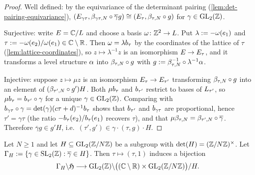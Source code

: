\begin{proof}
Well defined: by the equivariance of the determinant pairing
(\cref{lem:det-pairing-equivariance}),
$(E_{\gamma\tau}, \beta_{\gamma\tau,N}\circ\overline{\gamma} g)
\cong (E_{\tau}, \beta_{\tau,N}\circ g)$ for $\gamma \in \GL{2}{\ZZ}$.

Surjective: write $E = \mathbb{C}/L$ and choose a basis
$\omega \colon \mathbb{Z}^{2} \to L$. Put $\lambda := -\omega(e_{1})$
and $\tau := -\omega(e_{2})/\omega(e_{1}) \in \mathbb{C}\setminus\mathbb{R}$.
Then $\omega = \lambda b_{\tau}$ by the coordinates of the lattice
of $\tau$ (\cref{lem:lattice-coordinates}), so $z \mapsto \lambda^{-1}z$ is
an isomorphism $E \to E_{\tau}$, and it transforms a level structure
$\alpha$ into $\beta_{\tau,N}\circ g$ with
$g := \beta_{\tau,N}^{-1}\circ\lambda^{-1}\alpha$.

Injective: suppose $z \mapsto \mu z$ is an isomorphism
$E_{\tau} \to E_{\tau'}$ transforming
$\beta_{\tau,N} \circ g$ into an element of
$(\beta_{\tau',N}\circ g')H$. Both $\mu b_{\tau}$
and $b_{\tau'}$ restrict to bases of $L_{\tau'}$, so
$\mu b_{\tau} = b_{\tau'}\circ\gamma$ for a unique
$\gamma \in \GL{2}{\ZZ}$. Comparing with
$b_{\gamma\tau}\circ\gamma = \det(\gamma)(c\tau+d)^{-1}b_{\tau}$
shows that $b_{\tau'}$ and $b_{\gamma\tau}$ are
proportional, hence $\tau' = \gamma\tau$ (the ratio
$-b_{\tau}(e_{2})/b_{\tau}(e_{1})$
recovers $\tau$), and that $\mu\beta_{\tau,N} = \beta_{\tau',N}\circ\overline{\gamma}$.
Therefore $\overline{\gamma} g \in g' H$, i.e.\ $(\tau', g') \in
\gamma\cdot(\tau, g)\cdot H$.
\end{proof}

\begin{corollary}
\label{cor:classical-uniformisation}
Let $N \geq 1$ and let $H \subseteq \GL{2}{\ResidueRing{N}}$ be a subgroup
with $\det(H) = (\mathbb{Z}/N\mathbb{Z})^{\times}$. Let
$\GammaOfLevel{H} := \{\gamma \in \SL{2}{\ZZ} : \overline{\gamma} \in H\}$.
Then $\tau \mapsto (\tau, 1)$ induces a bijection
\[
  \GammaOfLevel{H}\backslash\UpperHalfPlane \longrightarrow
  \GL{2}{\ZZ}\backslash\bigl((\SlitPlane)\times\GL{2}{\ResidueRing{N}}\bigr)/H .
\]
\end{corollary}

